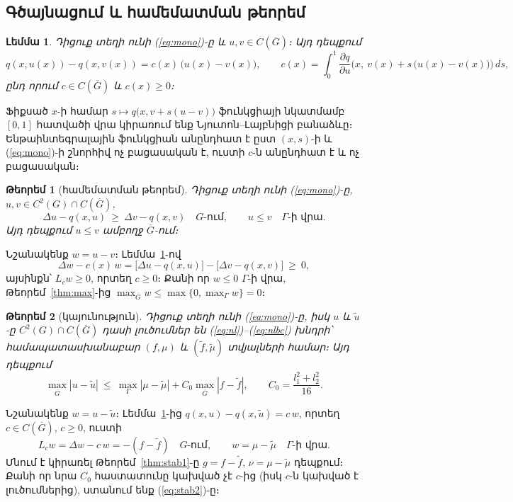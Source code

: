 \documentclass[12pt,a4paper]{article}
\makeatletter
\theoremstyle{arm}
\newtheorem{theorem}{Թեորեմ}
\newtheorem{lemma}{Լեմմա}
\theoremstyle{armdef}
\renewcommand{\proofname}{Ապացույց։}
\renewenvironment{proof}[1][\proofname]{\par\pushQED{\qed}\normalfont\topsep6\p@\@plus6\p@\relax
  \trivlist\item[\hskip\labelsep\bfseries #1]\ignorespaces}{\popQED\endtrivlist\@endpefalse}
\numberwithin{equation}{section}
\newcommand{\G}{\overline{G}}
\newcommand{\dd}[2]{\dfrac{\partial #1}{\partial #2}}
\makeatother
\begin{document}
\subsection{Գծայնացում և համեմատման թեորեմ}\label{sec:lin}

\begin{lemma}\label{lem:lin}
Դիցուք տեղի ունի (\ref{eq:mono})-ը և $u,v\in C(\G)$։ Այդ դեպքում
\[q(x,u(x))-q(x,v(x))=c(x)\,\big(u(x)-v(x)\big),\qquad c(x)=\int_0^1\dd{q}{u}\Big(x,\ v(x)+s\,\big(u(x)-v(x)\big)\Big)\,ds,\]
ընդ որում $c\in C(\G)$ և $c(x)\ge0$։
\end{lemma}

\begin{proof}
Ֆիքսած $x$-ի համար $s\mapsto q\big(x,v+s(u-v)\big)$ ֆունկցիայի նկատմամբ $[0,1]$ հատվածի վրա կիրառում ենք Նյուտոն--Լայբնիցի բանաձևը։ Ենթաինտեգրալային ֆունկցիան անընդհատ է ըստ $(x,s)$-ի և (\ref{eq:mono})-ի շնորհիվ ոչ բացասական է, ուստի $c$-ն անընդհատ է և ոչ բացասական։
\end{proof}

\begin{theorem}[համեմատման թեորեմ]\label{thm:comp}
Դիցուք տեղի ունի (\ref{eq:mono})-ը, $u,v\in C^2(G)\cap C(\G)$,
\[\Delta u-q(x,u)\ \ge\ \Delta v-q(x,v)\quad G\text{-ում},\qquad u\le v\quad\Gamma\text{-ի վրա}.\]
Այդ դեպքում $u\le v$ ամբողջ $\G$-ում։
\end{theorem}

\begin{proof}
Նշանակենք $w=u-v$։ Լեմմա~\ref{lem:lin}-ով
\[\Delta w-c(x)\,w=\big[\Delta u-q(x,u)\big]-\big[\Delta v-q(x,v)\big]\ \ge\ 0,\]
այսինքն՝ $L_cw\ge0$, որտեղ $c\ge0$։ Քանի որ $w\le0$ $\Gamma$-ի վրա, Թեորեմ~\ref{thm:max}-ից $\max_{\G}w\le\max\{0,\max_\Gamma w\}=0$։
\end{proof}

\begin{theorem}[կայունություն]\label{thm:stab2}
Դիցուք տեղի ունի (\ref{eq:mono})-ը, իսկ $u$ և $\tilde u$-ը $C^2(G)\cap C(\G)$ դասի լուծումներ են (\ref{eq:nl})--(\ref{eq:nlbc}) խնդրի՝ համապատասխանաբար $(f,\mu)$ և $(\tilde f,\tilde\mu)$ տվյալների համար։ Այդ դեպքում
\begin{equation}\label{eq:stab2}
\max_{\G}|u-\tilde u|\ \le\ \max_{\Gamma}|\mu-\tilde\mu|+C_0\max_{\G}|f-\tilde f|,\qquad C_0=\frac{l_1^2+l_2^2}{16}.
\end{equation}
\end{theorem}

\begin{proof}
Նշանակենք $w=u-\tilde u$։ Լեմմա~\ref{lem:lin}-ից $q(x,u)-q(x,\tilde u)=c\,w$, որտեղ $c\in C(\G)$, $c\ge0$, ուստի
\[L_cw=\Delta w-c\,w=-(f-\tilde f)\quad G\text{-ում},\qquad w=\mu-\tilde\mu\quad\Gamma\text{-ի վրա}.\]
Մնում է կիրառել Թեորեմ~\ref{thm:stab1}-ը $g=f-\tilde f$, $\nu=\mu-\tilde\mu$ դեպքում։ Քանի որ նրա $C_0$ հաստատունը կախված չէ $c$-ից (իսկ $c$-ն կախված է լուծումներից), ստանում ենք (\ref{eq:stab2})-ը։
\end{proof}
\end{document}

